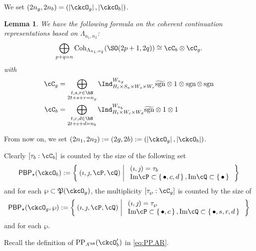 \documentclass[12pt,a4paper]{amsart}
\def\Im{\operatorname{Im}}
\def\abs#1{\left|{#1}\right|}
\newcommand{\sgn}{\operatorname{sgn}}
\numberwithin{equation}{section}
\newtheorem{lem}[thm]{Lemma}
\theoremstyle{remark}
\def\Cint#1{\Coh_{[#1]}}
\def\PP{\mathrm{PP}}
\def\Im{\mathrm{Im}}
\def\Coh{\mathrm{Coh}}
\def\CPP{\mathfrak{P}}
\def\hsgn{\widetilde{\mathrm{sgn}}}
\def\PBP{\mathsf{PBP}}
\begin{document}
We set $(2n_{g},2n_{b}) = (\abs{\ckcO_g},\abs{\ckcO_b})$.

\begin{lem}
  We have the following formula on the coherent continuation
  representations based on $\Lambda_{n_{1},n_{2}}$:
  \[
    \bigoplus_{p+q=n} \Coh_{\Lambda_{n_1, n_2}}(\SO(2p+1,2q)) \cong \cC_{b}\otimes \cC_{g}.
  \]
  with
  \[
    \begin{split}
      \cC_g %
      &=\bigoplus_{\substack{t,s,r\in\bN\\2t+s+r=n_{g}}} \Ind_{H_{t} \times S_{a}\times W_s\times W_r}^{W_{n_{g}}}
      \hsgn \otimes 1 \otimes \sgn \otimes \sgn \\
      \cC_b & =
      \bigoplus_{\substack{t,c,d\in \bN\\2t+c+d=n_{b}}}
      \Ind_{H_{t}\times W_{c}\times W_{d}}^{W_{n_{b}}} \hsgn\otimes 1\otimes 1
    \end{split}
  \]
\end{lem}


From now on, we set $ (2n_{1},2n_{2}) := (2g,2b) :=(\abs{\ckcO_g},\abs{\ckcO_b})$.

Clearly $[\tau_{b}:\cC_{b}]$ is counted by the size of the following set
\[
  \PBP_{\star}(\ckcO_b) := \Set{(\imath,\jmath,\cP,\cQ)| %
    \begin{array}{l}
      (\imath,\jmath) = \tau_{b}\\
      \Im \cP \subset \set{\bullet,c,d}, \Im \cQ \subset\set{\bullet}\\
    \end{array}
  }
\]
and for each $\wp\subset \CPP(\ckcO_{g})$, the multiplicity
$[\tau_{\wp}: \cC_{g}]$ is counted by the size of
\[
  \PBP_{\star}(\ckcO_g,\wp):= \Set{(\imath,\jmath,\cP,\cQ)| %
    \begin{array}{l}
      (\imath,\jmath) = \tau_{\wp}\\
      \Im \cP \subset \set{\bullet,c}, \Im \cQ \subset\set{\bullet, s,r,d}\\
    \end{array}
  }
\]
and for each $\wp$.

Recall the definition of $\PP_{A^{\bR}}(\ckcO'_{b})$ in  \eqref{eq:PP.AR}.
\end{document}
